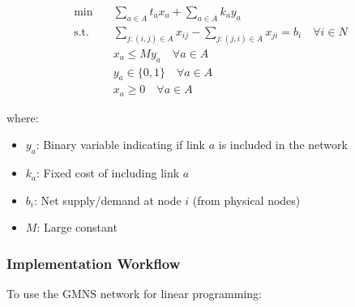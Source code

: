 \documentclass[11pt,a4paper]{article}
\begin{document}
\begin{align}
\min \quad & \sum_{a \in A} t_a x_a + \sum_{a \in A} k_a y_a \\
\text{s.t.} \quad & \sum_{j: (i,j) \in A} x_{ij} - \sum_{j: (j,i) \in A} x_{ji} = b_i \quad \forall i \in N \\
& x_a \leq M y_a \quad \forall a \in A \\
& y_a \in \{0,1\} \quad \forall a \in A \\
& x_a \geq 0 \quad \forall a \in A
\end{align}

where:
\begin{itemize}
    \item $y_a$: Binary variable indicating if link $a$ is included in the network
    \item $k_a$: Fixed cost of including link $a$
    \item $b_i$: Net supply/demand at node $i$ (from physical nodes)
    \item $M$: Large constant
\end{itemize}

\subsubsection{Implementation Workflow}

To use the GMNS network for linear programming:
\end{document}
